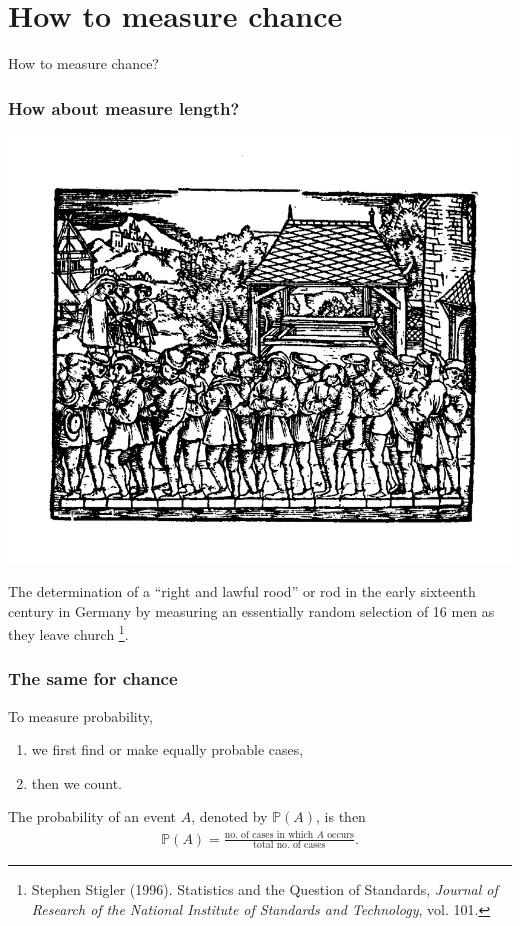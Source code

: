 \documentclass[9pt]{beamer}
\begin{document}
\section{How to measure chance}%
\begin{frame}[fragile] %
 \begin{center}
  \huge
  How to measure chance?
 \end{center}
\end{frame}
\begin{frame}[fragile,t] %
  \frametitle{How about measure length?}
  \begin{center}
    \includegraphics[scale=0.20]{./figs/Rood.png}
    \bigskip

    The determination of a ``right and lawful rood'' or rod in the early sixteenth century in
    Germany by measuring an essentially random selection of 16 men as they leave church
    \footnote{Stephen Stigler (1996). Statistics and the Question of Standards, {\em Journal of Research of
    the National Institute of Standards and Technology}, vol. 101.}.
  \end{center}
\end{frame}
\begin{frame}[fragile] %
  \frametitle{The same for chance}

  To measure probability, \pause
  \begin{enumerate}
    \item we first find or make equally probable cases,
    \item then we count.
  \end{enumerate}
  \bigskip \vfill \pause

  The probability of an event $A$, denoted by $\mathbb{P}(A)$, is then
  \begin{align*}
    \mathbb{P}(A) = \frac{\text{no. of cases in which $A$ occurs}}{\text{total no. of cases}}.
  \end{align*}

\end{frame}
\end{document}
